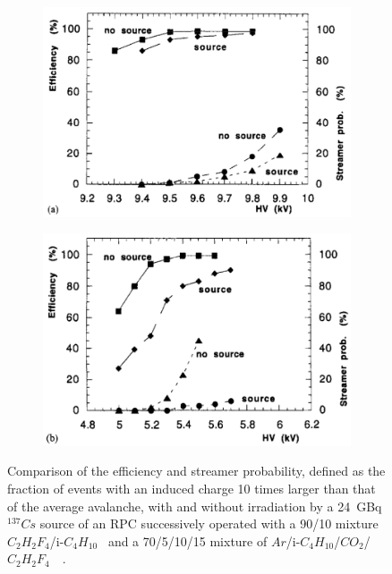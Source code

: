 	\begin{figure}[H]
		\begin{subfigure}{0.5\linewidth}
			\centering
			\includegraphics[width = \linewidth]{fig/chapt3/Freon-perf-irrad.png}
			\caption{\label{fig:FreonArgonPerf:A}}
		\end{subfigure}
		\begin{subfigure}{0.5\linewidth}
			\centering
			\includegraphics[width = \linewidth]{fig/chapt3/Argon-perf-irrad.png}
			\caption{\label{fig:FreonArgonPerf:B}}
		\end{subfigure}
		\caption{\label{fig:FreonArgonPerf} Comparison of the efficiency and streamer probability, defined as the fraction of events with an induced charge 10 times larger than that of the average avalanche, with and without irradiation by a \SI{24}{GBq} $^{137}Cs$ source of an RPC successively operated with a 90/10 mixture $C_2H_2F_4$/i-$C_4H_{10}$~ and a 70/5/10/15 mixture of $Ar$/i-$C_4H_{10}$/$CO_2$/$C_2H_2F_4$~~\cite{ABBRESCIA1997PERF}.}
	\end{figure}
	
